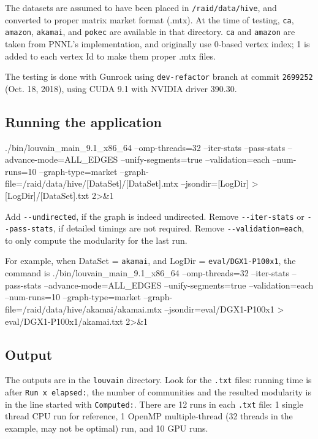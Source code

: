 \documentclass[10pt,article,oneside]{memoir}
\begin{document}
The datasets are assumed to have been placed in
\texttt{/raid/data/hive}, and converted to proper matrix market format
(.mtx). At the time of testing, \texttt{ca}, \texttt{amazon},
\texttt{akamai}, and \texttt{pokec} are available in that directory.
\texttt{ca} and \texttt{amazon} are taken from PNNL's implementation,
and originally use 0-based vertex index; 1 is added to each vertex Id to
make them proper .mtx files.

The testing is done with Gunrock using \texttt{dev-refactor} branch at
commit \texttt{2699252} (Oct. 18, 2018), using CUDA 9.1 with NVIDIA
driver 390.30.

\subsection{Running the application}\label{running-the-application-1}

 ./bin/louvain\_main\_9.1\_x86\_64 --omp-threads=32 --iter-stats
--pass-stats --advance-mode=ALL\_EDGES --unify-segments=true
--validation=each --num-runs=10 --graph-type=market
--graph-file=/raid/data/hive/{[}DataSet{]}/{[}DataSet{]}.mtx
--jsondir={[}LogDir{]} \textgreater{} {[}LogDir{]}/{[}DataSet{]}.txt
2\textgreater{}\&1

Add \texttt{-\/-undirected}, if the graph is indeed undirected. Remove
\texttt{-\/-iter-stats} or \texttt{-\/-pass-stats}, if detailed timings
are not required. Remove \texttt{-\/-validation=each}, to only compute
the modularity for the last run.

For example, when DataSet = \texttt{akamai}, and LogDir =
\texttt{eval/DGX1-P100x1}, the command is
./bin/louvain\_main\_9.1\_x86\_64 --omp-threads=32 --iter-stats
--pass-stats --advance-mode=ALL\_EDGES --unify-segments=true
--validation=each --num-runs=10 --graph-type=market
--graph-file=/raid/data/hive/akamai/akamai.mtx
--jsondir=eval/DGX1-P100x1 \textgreater{} eval/DGX1-P100x1/akamai.txt
2\textgreater{}\&1

\subsection{Output}\label{output-1}

The outputs are in the \texttt{louvain} directory. Look for the
\texttt{.txt} files: running time is after \texttt{Run\ x\ elapsed:},
the number of communities and the resulted modularity is in the line
started with \texttt{Computed:}. There are 12 runs in each \texttt{.txt}
file: 1 single thread CPU run for reference, 1 OpenMP multiple-thread
(32 threads in the example, may not be optimal) run, and 10 GPU runs.
\end{document}

